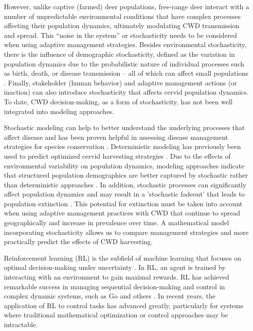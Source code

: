 \documentclass[12pt,a4paper,reqno]{amsart}
\theoremstyle{definition}
\theoremstyle{remark}
\theoremstyle{plain}
\begin{document}
However, unlike captive (farmed) deer populations, free-range deer interact with a number of unpredictable environmental conditions that have complex processes affecting their population dynamics, ultimately modulating CWD transmission and spread. This “noise in the system” or stochasticity needs to be considered when using adaptive management strategies. Besides environmental stochasticity, there is the influence of demographic stochasticity, defined as the variation in population dynamics due to the probabilistic nature of individual processes such as birth, death, or disease transmission – all of which can affect small populations \cite{lambert2018demographic}. Finally, stakeholder (human behavior) and adaptive management actions (or inaction) can also introduce stochasticity that affects cervid population dynamics. To date, CWD decision-making, as a form of stochasticity, has not been well integrated into modeling approaches.

Stochastic modeling can help to better understand the underlying processes that affect disease and has been proven helpful in assessing disease management strategies for species conservation \cite{wasserberg2009host}. Deterministic modeling has previously been used to predict optimized cervid harvesting strategies \cite{potapov2016chronic, belsare2021getting}. Due to the effects of environmental variability on population dynamics, modeling approaches indicate that structured population demographics are better captured by stochastic rather than deterministic approaches \cite{boyce2006demography, belsare2021getting}. In addition, stochastic processes can significantly affect population dynamics and may result in a 'stochastic fadeout' that leads to population extinction \cite{jnawali2022stochasticity}. This potential for extinction must be taken into account when using adaptive management practices with CWD that continue to spread geographically and increase in prevalence over time. A mathematical model incorporating stochasticity allows us to compare management strategies and more practically predict the effects of CWD harvesting.

Reinforcement learning (RL) is the subfield of machine learning that focuses on optimal decision-making under uncertainty \cite{sutton1998reinforcement, powell2007approximate, wiering2012reinforcement}. In RL, an agent is trained by interacting with an environment to gain maximal rewards. RL has achieved remarkable success in managing sequential decision-making and control in complex dynamic systems, such as Go and others \cite{fackeldey2022approximative, silver2016mastering}. In recent years, the application of RL to control tasks has advanced greatly, particularly for systems where traditional mathematical optimization or control approaches may be intractable. 
\end{document}
